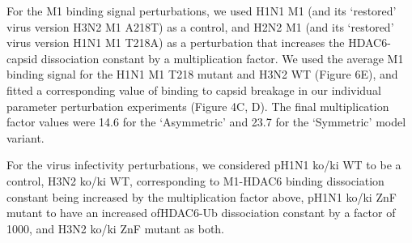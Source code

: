 For the M1 binding signal perturbations, we used H1N1 M1 (and its ‘restored’ virus version H3N2 M1 A218T) as a control, and H2N2 M1 (and its ‘restored’ virus version H1N1 M1 T218A) as a perturbation that increases the HDAC6-capsid dissociation constant by a multiplication factor. We used the average M1 binding signal for the H1N1 M1 T218 mutant and H3N2 WT (Figure 6E), and fitted a corresponding value of binding to capsid breakage in our individual parameter perturbation experiments (Figure 4C, D). The final multiplication factor values were 14.6 for the ‘Asymmetric’ and 23.7 for the ‘Symmetric’ model variant.

For the virus infectivity perturbations, we considered pH1N1 ko/ki WT to be a control, H3N2 ko/ki WT, corresponding to M1-HDAC6 binding dissociation constant being increased by the multiplication factor above, pH1N1 ko/ki ZnF mutant to have an increased ofHDAC6-Ub dissociation constant by a factor of 1000, and H3N2 ko/ki ZnF mutant as both.

